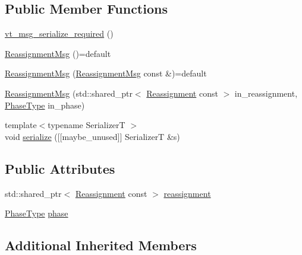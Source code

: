 \subsection*{Public Member Functions}
\begin{DoxyCompactItemize}
\item 
\hyperlink{structvt_1_1vrt_1_1collection_1_1balance_1_1_reassignment_msg_a68f835c023a0e40d572e160658f21a79}{vt\+\_\+msg\+\_\+serialize\+\_\+required} ()
\item 
\hyperlink{structvt_1_1vrt_1_1collection_1_1balance_1_1_reassignment_msg_aa5793ed4bbfed8a90e555088448340f3}{Reassignment\+Msg} ()=default
\item 
\hyperlink{structvt_1_1vrt_1_1collection_1_1balance_1_1_reassignment_msg_a763b37977eaa7d5622a4a2d08c97fbb5}{Reassignment\+Msg} (\hyperlink{structvt_1_1vrt_1_1collection_1_1balance_1_1_reassignment_msg}{Reassignment\+Msg} const \&)=default
\item 
\hyperlink{structvt_1_1vrt_1_1collection_1_1balance_1_1_reassignment_msg_acd76d7b6d8b825e1ab58dcd44d35cc9d}{Reassignment\+Msg} (std\+::shared\+\_\+ptr$<$ \hyperlink{structvt_1_1vrt_1_1collection_1_1balance_1_1_reassignment}{Reassignment} const $>$ in\+\_\+reassignment, \hyperlink{namespacevt_a46ce6733d5cdbd735d561b7b4029f6d7}{Phase\+Type} in\+\_\+phase)
\item 
{\footnotesize template$<$typename SerializerT $>$ }\\void \hyperlink{structvt_1_1vrt_1_1collection_1_1balance_1_1_reassignment_msg_a08a1afb1488bf474c69efc95192d77ae}{serialize} (\mbox{[}\mbox{[}maybe\+\_\+unused\mbox{]}\mbox{]} SerializerT \&s)
\end{DoxyCompactItemize}
\subsection*{Public Attributes}
\begin{DoxyCompactItemize}
\item 
std\+::shared\+\_\+ptr$<$ \hyperlink{structvt_1_1vrt_1_1collection_1_1balance_1_1_reassignment}{Reassignment} const  $>$ \hyperlink{structvt_1_1vrt_1_1collection_1_1balance_1_1_reassignment_msg_a17f0d17ffa2e5ba75e5b114a6de20449}{reassignment}
\item 
\hyperlink{namespacevt_a46ce6733d5cdbd735d561b7b4029f6d7}{Phase\+Type} \hyperlink{structvt_1_1vrt_1_1collection_1_1balance_1_1_reassignment_msg_aa50fedcf313128383376cc636dacb0a7}{phase}
\end{DoxyCompactItemize}
\subsection*{Additional Inherited Members}


